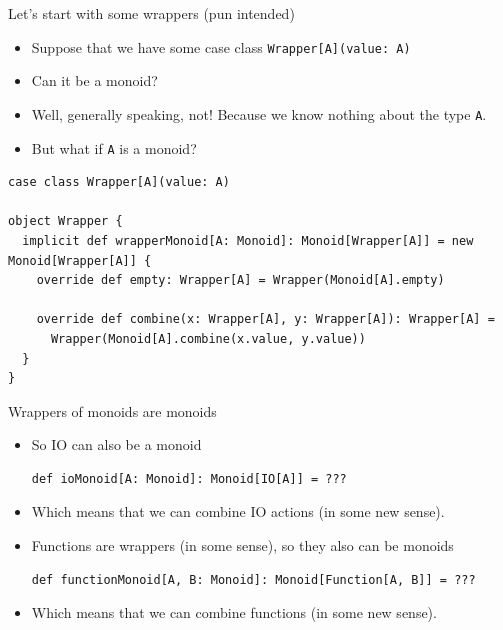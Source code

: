 \documentclass[presentation,aspectratio=169,smaller]{beamer}
\begin{document}
\begin{frame}[label={sec:org576e6e0},fragile]{Let's start with some wrappers (pun intended)}
 \begin{itemize}
\item Suppose that we have some case class \texttt{Wrapper[A](value: A)}
\item Can it be a monoid?
\item Well, generally speaking, not! Because we know nothing about the type \texttt{A}.
\item But what if \texttt{A} is a monoid?
\end{itemize}

\pause

\begin{verbatim}
case class Wrapper[A](value: A)

object Wrapper {
  implicit def wrapperMonoid[A: Monoid]: Monoid[Wrapper[A]] = new Monoid[Wrapper[A]] {
    override def empty: Wrapper[A] = Wrapper(Monoid[A].empty)

    override def combine(x: Wrapper[A], y: Wrapper[A]): Wrapper[A] =
      Wrapper(Monoid[A].combine(x.value, y.value))
  }
}
\end{verbatim}
\end{frame}

\begin{frame}[label={sec:orgc89e989},fragile]{Wrappers of monoids are monoids}
 \begin{itemize}
\item So IO can also be a monoid
\begin{verbatim}
def ioMonoid[A: Monoid]: Monoid[IO[A]] = ???
\end{verbatim}
\item Which means that we can combine IO actions (in some new sense).
\item Functions are wrappers (in some sense), so they also can be monoids
\begin{verbatim}
def functionMonoid[A, B: Monoid]: Monoid[Function[A, B]] = ???
\end{verbatim}
\item Which means that we can combine functions (in some new sense).
\end{itemize}
\end{frame}
\end{document}
